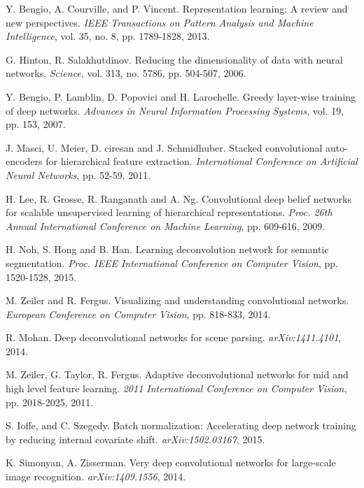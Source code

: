\documentclass[preprint,12pt]{elsarticle}
\begin{document}
\begin{thebibliography}{99}
Y. Bengio, A. Courville, and P. Vincent. Representation learning: A review and new perspectives.
\textit{IEEE Transactions on Pattern Analysis and Machine Intelligence}, vol. 35, no. 8, pp. 1789-1828, 2013.

G. Hinton, R. Salakhutdinov. Reducing the dimensionality of data with neural networks.
\textit{Science}, vol. 313, no. 5786, pp. 504-507, 2006.

Y. Bengio, P. Lamblin, D. Popovici and H. Larochelle. Greedy layer-wise training of deep networks.
\textit{Advances in Neural Information Processing Systems}, vol. 19, pp. 153, 2007.

J. Masci, U. Meier, D. ciresan and J. Schmidhuber. Stacked convolutional auto-encoders for hierarchical feature extraction. \textit{International Conference on Artificial Neural Networks}, pp. 52-59, 2011.

H. Lee, R. Grosse, R. Ranganath and A. Ng. Convolutional deep belief networks for scalable unsupervised learning of hierarchical representations.
\textit{Proc. 26th Annual International Conference on Machine Learning}, pp. 609-616, 2009.

H. Noh, S. Hong and B. Han. Learning deconvolution network for semantic segmentation.
\textit{Proc. IEEE International Conference on Computer Vision}, pp. 1520-1528, 2015.

M. Zeiler and R. Fergus. Visualizing and understanding convolutional networks.
\textit{European Conference on Computer Vision}, pp. 818-833, 2014.

R. Mohan. Deep deconvolutional networks for scene parsing. \textit{arXiv:1411.4101}, 2014.

M. Zeiler, G. Taylor, R. Fergus. Adaptive deconvolutional networks for mid and high level feature learning.
\textit{2011 International Conference on Computer Vision}, pp. 2018-2025, 2011.

S. Ioffe, and C. Szegedy. Batch normalization: Accelerating deep network training by reducing internal
covariate shift. \textit{arXiv:1502.03167}, 2015.

K. Simonyan, A. Zisserman. Very deep convolutional networks for large-scale image recognition.
\textit{arXiv:1409.1556}, 2014.


\end{thebibliography}
\end{document}

